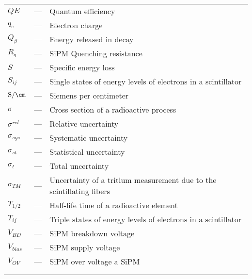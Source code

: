 \begin{longtable}{p{25mm} c p{120mm} }
$QE$ & --- & Quantum efficiency\\
$q_{e}$ & --- & Electron charge\\
$Q_\beta$ & --- & Energy released in decay\\
$R_q$ & --- & SiPM Quenching resistance\\
$S$ & --- & Specific energy loss\\
$S_{ij}$ & --- & Single states of energy levels of electrons in a 
\newline
scintillator\\
$\text{S}/\cm$ & --- & Siemens per centimeter\\
$\sigma$ & --- & Cross section of a radioactive process\\
$\sigma^{rel}$ & --- & Relative uncertainty\\
$\sigma_{sys}$ & --- & Systematic uncertainty\\
$\sigma_{st}$ & --- & Statistical uncertainty\\
$\sigma_{t}$ & --- & Total uncertainty\\
$\sigma_{TM}$ & --- & Uncertainty of a tritium measurement
\newline
due to the scintillating fibers\\
$T_{1/2}$ & --- & Half-life time of a radioactive element\\
$T_{ij}$ & --- & Triple states of energy levels of electrons in a 
\newline
scintillator\\
$V_{BD}$ & --- & SiPM breakdown voltage\\
$V_{bias}$ & --- & SiPM supply voltage\\
$V_{OV}$ & --- & SiPM over voltage a SiPM\\
\\
\\

\end{longtable}
